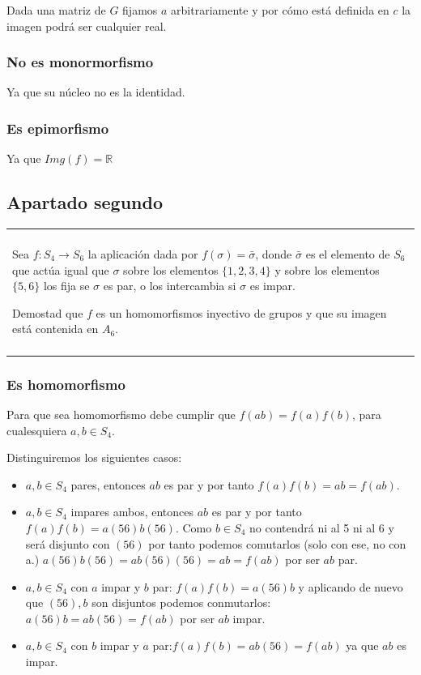 \documentclass[12pt]{article}
\newenvironment{micaja}
{
    \begin{center}
    \begin{tabular}{|p{0.9\textwidth}|}
    \hline\\
    }   
    {   
    \\\\\hline
    \end{tabular} 
    \end{center}
    }
\begin{document}
Dada una matriz de $G$ fijamos $a$ arbitrariamente
y por cómo está definida en $c$ la imagen podrá ser cualquier real. 


\subsubsection*{No es monormorfismo}
Ya que su núcleo no es la identidad.

\subsubsection*{Es epimorfismo}
Ya que $Img(f) = \mathbb R$

\newpage
\subsection{Apartado segundo}

\begin{micaja}
    Sea $f:S_4 \rightarrow S_6$ la aplicación dada por
    $f(\sigma) = \bar \sigma$, donde $\bar \sigma$
    es el elemento de $S_6$ que actúa igual que $\sigma$
    sobre los elementos $\{1,2,3,4\}$ y sobre los elementos
    $\{5,6\}$ los fija se $\sigma$ es par, o los intercambia
    si $\sigma$ es impar.

    Demostad que $f$ es un homomorfismos 
    inyectivo de grupos y que su imagen está contenida en $A_6.$
\end{micaja}

\subsubsection*{Es homomorfismo}

Para que sea homomorfismo debe cumplir que $f(ab) = f(a)f(b)$, para cualesquiera $a,b \in S_4.$

Distinguiremos los siguientes casos: 

\begin{itemize}
    \item $a,b \in S_4$ pares, entonces $ab$ es par y por tanto $f(a)f(b)=ab = f(ab).$
    \item $a,b \in S_4$ impares ambos, entonces $ab$ es par y por tanto $f(a)f(b)=a(56)b(56).$
    Como $b \in S_4$ no contendrá ni al 5 ni al 6 y será disjunto con $(56)$ por tanto podemos comutarlos
    (solo con ese, no con a.) $a(56)b(56) = ab(56)(56) = ab = f(ab)$ por ser $ab$ par.
    \item $a,b \in S_4$ con $a$ impar y $b$ par: $f(a)f(b) = a(56)b$ y aplicando de nuevo que $(56),b$ son
    disjuntos podemos conmutarlos:$a(56)b = ab(56) = f(ab)$ por ser $ab$ impar.
    \item $a,b \in S_4$ con $b$ impar y $a$ par:$f(a)f(b)= ab(56) = f(ab)$ ya que $ab$ es impar. 
\end{itemize}
\end{document}
